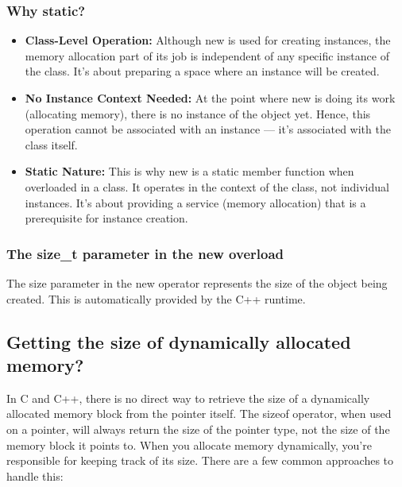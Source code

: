 \documentclass{report}
\begin{document}
    \subsubsection{Why static?}
    \begin{itemize}
        \item \textbf{Class-Level Operation:} Although new is used for creating instances, the memory allocation part of its job is independent of any specific instance of the class. It's about preparing a space where an instance will be created.
        \item \textbf{No Instance Context Needed:} At the point where new is doing its work (allocating memory), there is no instance of the object yet. Hence, this operation cannot be associated with an instance — it's associated with the class itself.
        \item \textbf{Static Nature:} This is why new is a static member function when overloaded in a class. It operates in the context of the class, not individual instances. It's about providing a service (memory allocation) that is a prerequisite for instance creation.
    \end{itemize}
    \pagebreak 
    \subsubsection{The size\_t parameter in the new overload}
    \bigbreak \noindent 
     The size parameter in the new operator represents the size of the object being created. This is automatically provided by the C++ runtime.

     \bigbreak \noindent 
    \subsection{Getting the size of dynamically allocated memory?}
    \bigbreak \noindent 
    \begin{concept}
        In C and C++, there is no direct way to retrieve the size of a dynamically allocated memory block from the pointer itself. The sizeof operator, when used on a pointer, will always return the size of the pointer type, not the size of the memory block it points to. 
        \bigbreak \noindent 
        When you allocate memory dynamically, you're responsible for keeping track of its size. There are a few common approaches to handle this:
    \end{concept}


    \bigbreak \noindent 
\end{document}
